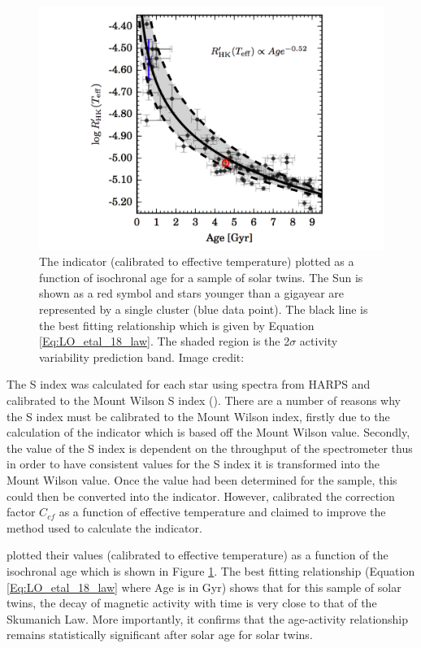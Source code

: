 \begin{figure}
    \centering
    \includegraphics[scale=0.45]{Figures/2-Historical_overview/LO_etal_18_age_activity_plot.pdf}
    \caption[\Rprime - age relationship for sample of solar twins]{The \Rprime indicator (calibrated to effective temperature) plotted as a function of isochronal age for a sample of solar twins. The Sun is shown as a red symbol and stars younger than a gigayear are represented by a single cluster (blue data point). The black line is the best fitting relationship which is given by Equation \ref{Eq:LO_etal_18_law}. The shaded region is the 2$\sigma$ activity variability prediction band. Image credit: \citet{Lorenzo_Oliveira_etal_2018}}
    \label{fig:LO_etal_18_plot}
\end{figure}

The S index was calculated for each star using spectra from HARPS and calibrated to the Mount Wilson S index (\Smw). There are a number of reasons why the S index must be calibrated to the Mount Wilson index, firstly due to the calculation of the \Rprime indicator which is based off the Mount Wilson value. Secondly, the value of the S index is dependent on the throughput of the spectrometer thus in order to have consistent values for the S index it is transformed into the Mount Wilson value. Once the \Smw value had been determined for the sample, this could then be converted into the \Rprime indicator. However, \citet{Lorenzo_Oliveira_etal_2018} calibrated the correction factor $C_{cf}$ as a function of effective temperature and claimed to improve the method used to calculate the \Rprime indicator.

\citet{Lorenzo_Oliveira_etal_2018} plotted their \Rprime values (calibrated to effective temperature) as a function of the isochronal age which is shown in Figure \ref{fig:LO_etal_18_plot}. The best fitting relationship (Equation \ref{Eq:LO_etal_18_law} where Age is in Gyr) shows that for this sample of solar twins, the decay of magnetic activity with time is very close to that of the Skumanich Law. More importantly, it confirms that the age-activity relationship remains statistically significant after solar age for solar twins.

